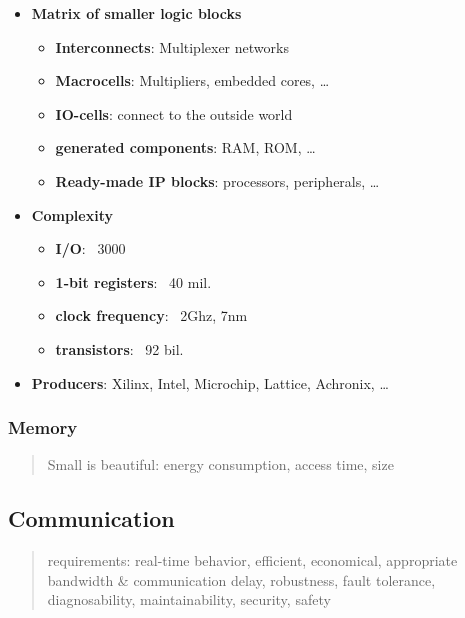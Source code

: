 \documentclass{article}
\begin{document}
\begin{itemize}
  \item \textbf{Matrix of smaller logic blocks}
        \begin{itemize}
          \item \textbf{Interconnects}: Multiplexer networks
          \item \textbf{Macrocells}: Multipliers, embedded cores, …
          \item \textbf{IO-cells}: connect to the outside world
          \item \textbf{generated components}: RAM, ROM, …
          \item \textbf{Ready-made IP blocks}: processors, peripherals, …
        \end{itemize}
  \item \textbf{Complexity}
        \begin{itemize}
          \item \textbf{I/O}: ~3000
          \item \textbf{1-bit registers}: ~40 mil.
          \item \textbf{clock frequency}: ~2Ghz, 7nm
          \item \textbf{transistors}: ~92 bil.
        \end{itemize}
  \item \textbf{Producers}: Xilinx, Intel, Microchip, Lattice, Achronix, …
\end{itemize}

\subsubsection{Memory}
\begin{quote}Small is beautiful: energy consumption, access time, size\end{quote}

\subsection{Communication}
\begin{quote}requirements: real-time behavior, efficient, economical, appropriate bandwidth \& communication delay, robustness, fault tolerance, diagnosability, maintainability, security, safety\end{quote}
\end{document}
